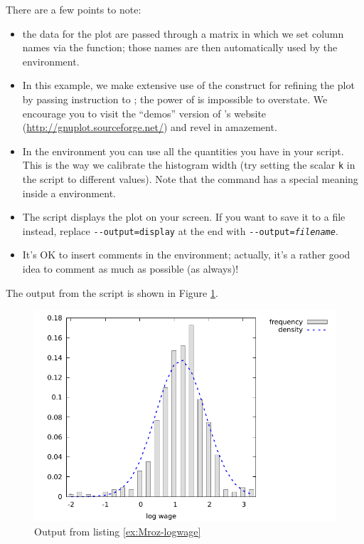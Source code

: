 There are a few points to note:
\begin{itemize}
\item the data for the plot are passed through a matrix in which we
  set column names via the  function; those names are
  then automatically used by the  environment.
\item In this example, we make extensive use of the 
  construct for refining the plot by passing instruction to
  ; the power of  is impossible to
  overstate. We encourage you to visit the ``demos'' version of
  's website (\url{http://gnuplot.sourceforge.net/}) and
  revel in amazement.
\item In the  environment you can use all the quantities you
  have in your script. This is the way we calibrate the histogram
  width (try setting the scalar \verb|k| in the script to different
  values). Note that the  command has a special meaning
  inside a  environment.
\item The script displays the plot on your screen. If you want to save
  it to a file instead, replace \verb!--output=display! at the end
  with \texttt{-{}-output=\textsl{filename}}.
\item It's OK to insert comments in the  environment;
  actually, it's a rather good idea to comment as much as possible (as
  always)!
\end{itemize}
The output from the script is shown in Figure \ref{fig:Mroz-logwage}.


\begin{figure}[htbp]
  \centering
  \includegraphics{figures/Mroz-logwage}
  \caption{Output from listing \ref{ex:Mroz-logwage}}
  \label{fig:Mroz-logwage}
\end{figure}

